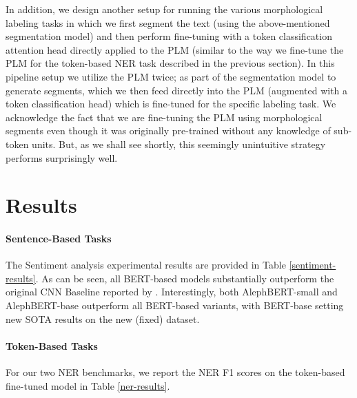 \documentclass[11pt,a4paper]{article}
\begin{document}
In addition, we design another setup for running the various morphological labeling tasks in which we first segment the text (using the above-mentioned segmentation model) and then perform fine-tuning with a token classification attention head directly applied to the PLM (similar to the way we fine-tune the PLM for the token-based NER task described in the previous section).
In this pipeline setup we utilize the PLM twice; as part of the segmentation model to generate segments, which we then feed directly into the PLM (augmented with a token classification head) which is fine-tuned for the specific labeling task.
We acknowledge the fact that we are fine-tuning the PLM using morphological segments even though it was originally pre-trained without any knowledge of sub-token units. But, as we shall see shortly, this seemingly unintuitive strategy performs surprisingly well.

\section{Results}
\paragraph{Sentence-Based Tasks}
The Sentiment analysis experimental results are provided in Table \ref{sentiment-results}. As can be seen, all BERT-based models substantially outperform the original CNN Baseline reported by \citet{amram2018}. Interestingly, both AlephBERT-small and AlephBERT-base outperform all BERT-based variants, with BERT-base setting new SOTA results on the new (fixed) dataset.

\paragraph{Token-Based Tasks}
For our two NER benchmarks, we report the NER F1 scores  on the token-based fine-tuned model  in Table \ref{ner-results}.
\end{document}
